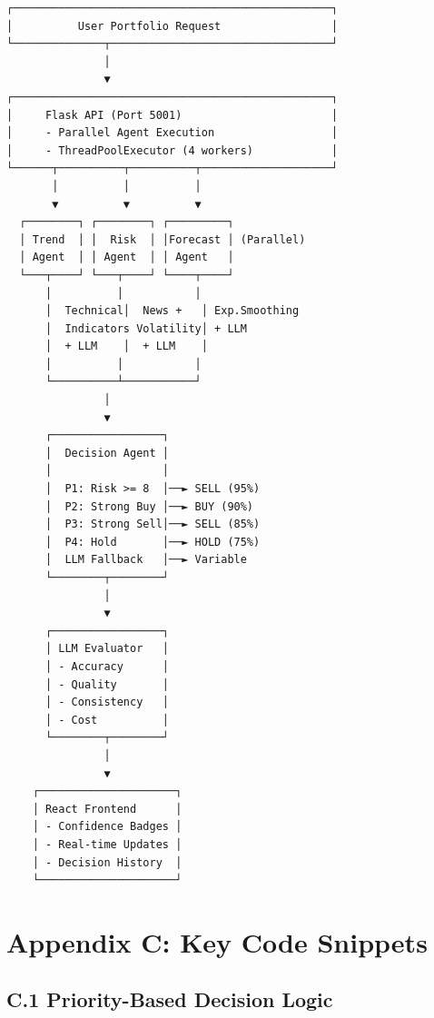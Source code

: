 \documentclass[11pt,letterpaper]{article}
\begin{document}
\begin{verbatim}
┌─────────────────────────────────────────────────┐
│          User Portfolio Request                 │
└──────────────┬──────────────────────────────────┘
               │
               ▼
┌─────────────────────────────────────────────────┐
│     Flask API (Port 5001)                       │
│     - Parallel Agent Execution                  │
│     - ThreadPoolExecutor (4 workers)            │
└──────┬──────────┬──────────┬────────────────────┘
       │          │          │
       ▼          ▼          ▼
  ┌────────┐ ┌────────┐ ┌─────────┐
  │ Trend  │ │  Risk  │ │Forecast │ (Parallel)
  │ Agent  │ │ Agent  │ │ Agent   │
  └───┬────┘ └───┬────┘ └────┬────┘
      │          │           │
      │  Technical│  News +   │ Exp.Smoothing
      │  Indicators Volatility│ + LLM
      │  + LLM    │  + LLM    │
      │          │           │
      └──────────┴───────────┘
               │
               ▼
      ┌─────────────────┐
      │  Decision Agent │
      │                 │
      │  P1: Risk >= 8  │──► SELL (95%)
      │  P2: Strong Buy │──► BUY (90%)
      │  P3: Strong Sell│──► SELL (85%)
      │  P4: Hold       │──► HOLD (75%)
      │  LLM Fallback   │──► Variable
      └────────┬────────┘
               │
               ▼
      ┌─────────────────┐
      │ LLM Evaluator   │
      │ - Accuracy      │
      │ - Quality       │
      │ - Consistency   │
      │ - Cost          │
      └────────┬────────┘
               │
               ▼
    ┌─────────────────────┐
    │ React Frontend      │
    │ - Confidence Badges │
    │ - Real-time Updates │
    │ - Decision History  │
    └─────────────────────┘
\end{verbatim}

\section*{Appendix C: Key Code Snippets}

\subsection*{C.1 Priority-Based Decision Logic}
\end{document}
